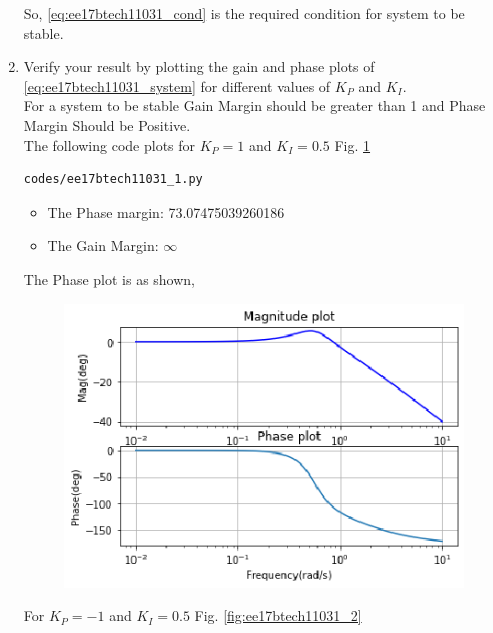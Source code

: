 \begin{enumerate}[label=\thesection.\arabic*.,ref=\thesection.\theenumi]
So, \eqref{eq:ee17btech11031_cond} is the required condition for system to be stable.


\item Verify your result by plotting the gain and phase plots of \eqref{eq:ee17btech11031_system} for different values of $K_{P}$ and $K_{I}$.
\\
\solution For a system to be stable Gain Margin should be greater than 1 and Phase Margin Should be Positive.
\\
The following code plots for $K_{P} = 1$ and $K_{I} = 0.5$ Fig. \ref{fig:ee17btech11031_1}

\begin{lstlisting}
codes/ee17btech11031_1.py
\end{lstlisting}
\begin{itemize}
    \item The Phase margin: 73.07475039260186
    \item The Gain Margin: $\infty$
\end{itemize}

The Phase plot is as shown,
\begin{figure}[!ht]
  \centering
  \includegraphics[width=\columnwidth]{./figs/ee17btech11031_1.eps}
  \caption{}
  \label{fig:ee17btech11031_1}
\end{figure}

For $K_{P} = -1$ and $K_{I} = 0.5$ Fig. \ref{fig:ee17btech11031_2} 


\end{enumerate}
